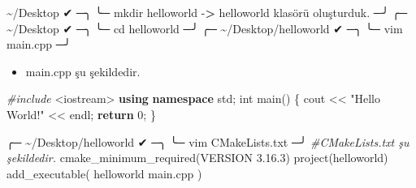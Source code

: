 \documentclass[
]{book}
\newenvironment{Shaded}{\begin{snugshade}}{\end{snugshade}}
\newcommand{\BuiltInTok}[1]{#1}
\newcommand{\CommentTok}[1]{\textcolor[rgb]{0.56,0.35,0.01}{\textit{#1}}}
\newcommand{\ControlFlowTok}[1]{\textcolor[rgb]{0.13,0.29,0.53}{\textbf{#1}}}
\newcommand{\DataTypeTok}[1]{\textcolor[rgb]{0.13,0.29,0.53}{#1}}
\newcommand{\DecValTok}[1]{\textcolor[rgb]{0.00,0.00,0.81}{#1}}
\newcommand{\ExtensionTok}[1]{#1}
\newcommand{\FunctionTok}[1]{\textcolor[rgb]{0.00,0.00,0.00}{#1}}
\newcommand{\ImportTok}[1]{#1}
\newcommand{\KeywordTok}[1]{\textcolor[rgb]{0.13,0.29,0.53}{\textbf{#1}}}
\newcommand{\NormalTok}[1]{#1}
\newcommand{\OperatorTok}[1]{\textcolor[rgb]{0.81,0.36,0.00}{\textbf{#1}}}
\newcommand{\PreprocessorTok}[1]{\textcolor[rgb]{0.56,0.35,0.01}{\textit{#1}}}
\newcommand{\StringTok}[1]{\textcolor[rgb]{0.31,0.60,0.02}{#1}}
\providecommand{\tightlist}{%
  \setlength{\itemsep}{0pt}\setlength{\parskip}{0pt}}
\begin{document}
\begin{Shaded}
\begin{Highlighting}[]
     \ExtensionTok{\textasciitilde{}/Desktop}\NormalTok{                                                            ✔ ─╮}
\NormalTok{╰─ }\FunctionTok{mkdir}\NormalTok{ helloworld   {-}}\OperatorTok{>}\NormalTok{ helloworld klasörü oluşturduk.                     ─╯}
\NormalTok{╭─ }\ExtensionTok{\textasciitilde{}/Desktop}\NormalTok{                                                              ✔ ─╮}
\NormalTok{╰─ }\BuiltInTok{cd}\NormalTok{ helloworld                                                            ─╯}
\NormalTok{╭─ }\ExtensionTok{\textasciitilde{}/Desktop/helloworld}\NormalTok{                                                   ✔ ─╮}
\NormalTok{╰─ }\ExtensionTok{vim}\NormalTok{ main.cpp                                                             ─╯}
\end{Highlighting}
\end{Shaded}

\begin{itemize}
\tightlist
\item
  main.cpp şu şekildedir.
\end{itemize}

\begin{Shaded}
\begin{Highlighting}[]
   \PreprocessorTok{\#include }\ImportTok{<iostream>}
   \KeywordTok{using} \KeywordTok{namespace}\NormalTok{ std;}
   \DataTypeTok{int}\NormalTok{ main() \{}
\NormalTok{        cout << }\StringTok{"Hello World!"}\NormalTok{ << endl;}
        \ControlFlowTok{return} \DecValTok{0}\NormalTok{;}
\NormalTok{   \}}
\end{Highlighting}
\end{Shaded}

\begin{Shaded}
\begin{Highlighting}[]
\NormalTok{╭─ }\ExtensionTok{\textasciitilde{}/Desktop/helloworld}\NormalTok{                                                   ✔ ─╮}
\NormalTok{╰─ }\ExtensionTok{vim}\NormalTok{ CMakeLists.txt                                                       ─╯}
   \CommentTok{\#CMakeLists.txt şu şekildedir.}
   \ExtensionTok{cmake\_minimum\_required}\NormalTok{(VERSION 3.16.3)}
   \ExtensionTok{project}\NormalTok{(helloworld)}
   \ExtensionTok{add\_executable}\NormalTok{(}
       \ExtensionTok{helloworld}
        \ExtensionTok{main.cpp}
\NormalTok{   )}
\end{Highlighting}
\end{Shaded}
\end{document}
